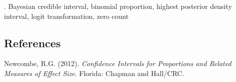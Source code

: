 \documentclass[12pt]{article}
\begin{document}
\vskip 2mm

.
Bayesian credible interval, binomial proportion, highest posterior density interval, logit transformation, zero count

%        
%
%        

\subsection*{References}

\begin{description}
\item
Newcombe, R.G. (2012).
\textit{Confidence Intervals for Proportions and Related Measures of Effect Size}. 
Florida: Chapman and Hall/CRC.
\end{description}
\end{document}
